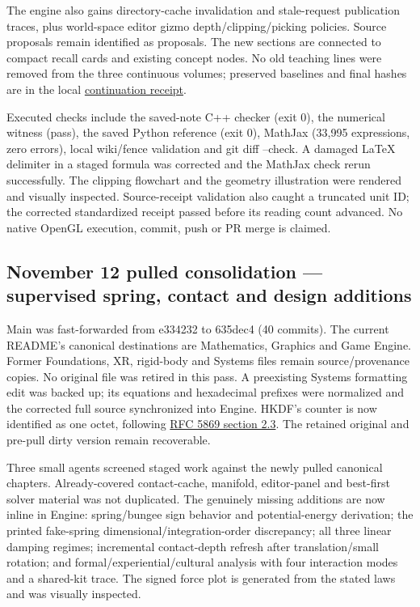 The engine also gains directory-cache invalidation and stale-request publication traces, plus world-space editor gizmo depth/clipping/picking policies. Source proposals remain identified as proposals. The new sections are connected to compact recall cards and existing concept nodes. No old teaching lines were removed from the three continuous volumes; preserved baselines and final hashes are in the local \hyperref[source-file-b6995c240bd0fe5e79138503]{continuation receipt}.

Executed checks include the saved-note C++ checker (exit 0), the numerical witness (pass), the saved Python reference (exit 0), MathJax (33,995 expressions, zero errors), local wiki/fence validation and git diff --check. A damaged LaTeX delimiter in a staged formula was corrected and the MathJax check rerun successfully. The clipping flowchart and the geometry illustration were rendered and visually inspected. Source-receipt validation also caught a truncated unit ID; the corrected standardized receipt passed before its reading count advanced. No native OpenGL execution, commit, push or PR merge is claimed.

\subsection{November 12 pulled consolidation --- supervised spring, contact and design additions}\label{appendix-a103e7846d21-november-12-pulled-consolidation-supervised-spring-contact-and-design-additions}

Main was fast-forwarded from e334232 to 635dec4 (40 commits). The current README's canonical destinations are Mathematics, Graphics and Game Engine. Former Foundations, XR, rigid-body and Systems files remain source/provenance copies. No original file was retired in this pass. A preexisting Systems formatting edit was backed up; its equations and hexadecimal prefixes were normalized and the corrected full source synchronized into Engine. HKDF's counter is now identified as one octet, following \href{https://www.rfc-editor.org/rfc/rfc5869.html\#section-2.3}{RFC 5869 section 2.3}. The retained original and pre-pull dirty version remain recoverable.

Three small agents screened staged work against the newly pulled canonical chapters. Already-covered contact-cache, manifold, editor-panel and best-first solver material was not duplicated. The genuinely missing additions are now inline in Engine: spring/bungee sign behavior and potential-energy derivation; the printed fake-spring dimensional/integration-order discrepancy; all three linear damping regimes; incremental contact-depth refresh after translation/small rotation; and formal/experiential/cultural analysis with four interaction modes and a shared-kit trace. The signed force plot is generated from the stated laws and was visually inspected.

